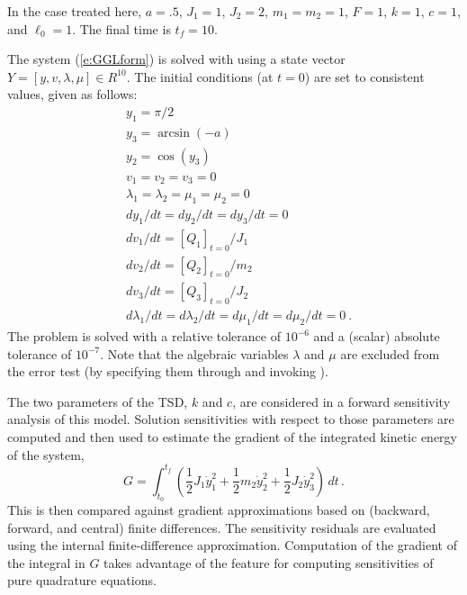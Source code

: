 In the case treated here, $a = .5$, $J_1 = 1$, $J_2 = 2$, $m_1 = m_2 = 1$,
$F = 1$, $k = 1$, $c = 1$, and $\ell_0 = 1$. The final time is $t_f = 10$.

The system (\ref{e:GGLform}) is solved with {\idas} using a state vector
$Y = [y, v, \lambda, \mu] \in R^{10}$.   The initial conditions (at $t = 0$)
are set to consistent values, given as follows:
\begin{equation*}
  \begin{split}
    &y_1 = \pi/2 \\
    &y_3 = \arcsin(-a) \\
    &y_2 = \cos(y_3) \\
    &v_1 = v_2 = v_3 = 0 \\
    &\lambda_1 = \lambda_2 = \mu_1 = \mu_2 = 0 \\
    &dy_1/dt = dy_2/dt = dy_3/dt = 0 \\
    &dv_1/dt = \left[Q_1\right]_{t=0} / J_1 \\
    &dv_2/dt = \left[Q_2\right]_{t=0} / m_2 \\
    &dv_3/dt = \left[Q_3\right]_{t=0} / J_2 \\
    &d\lambda_1/dt = d\lambda_2/dt = d\mu_1/dt = d\mu_2/dt = 0 ~.
  \end{split}
\end{equation*}
The problem is solved with a relative tolerance of $10^{-6}$ and a (scalar) absolute
tolerance of $10^{-7}$. Note that the algebraic variables $\lambda$ and $\mu$ are
excluded from the error test (by specifying them through  and invoking
).

The two parameters of the TSD, $k$ and $c$, are considered in a forward
sensitivity analysis of this model. Solution sensitivities with respect
to those parameters are computed and then used to estimate the gradient
of the integrated kinetic energy of the system,
\begin{equation}
  G = \int_{t_0}^{t_f} \left(    
    \frac{1}{2} J_1 \dot y_1^2 + \frac{1}{2} m_2 \dot y_2^2 + \frac{1}{2} J_2 \dot y_3^2 \right) \, dt \, .
\end{equation}
This is then compared against gradient approximations based on (backward, forward, and central)
finite differences.  The sensitivity residuals are evaluated using the {\idas} internal
finite-difference approximation.  Computation of the gradient of the integral in $G$ takes
advantage of the {\idas} feature for computing sensitivities of pure quadrature equations.

